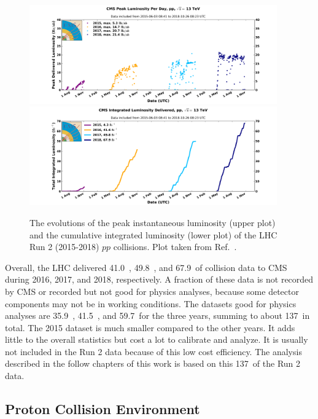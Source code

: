 \begin{figure}[!htb]
    \centering
    \includegraphics[width=0.95\textwidth]{pics/LHC_CMS/peak_lumi_pp_run2.png}
    \includegraphics[width=0.95\textwidth]{pics/LHC_CMS/int_lumi_cumulative_pp_1_run2.png}
    \caption{The evolutions of the peak instantaneous luminosity (upper plot) and the cumulative integrated luminosity (lower plot)
             of the LHC Run 2 (2015-2018) $pp$ collisions.
             Plot taken from Ref.~\cite{lhc_lumi_pub}.}
    \label{fig:lhc_lumi}
\end{figure}

Overall, the LHC delivered 41.0~\invfb, 49.8~\invfb, and 67.9~\invfb of collision data to CMS during 2016, 2017, and 2018, respectively.
A fraction of these data is not recorded by CMS or recorded but not good for physics analyses, because some detector components may not be in working conditions.
The datasets good for physics analyses are 35.9~\invfb, 41.5~\invfb, and 59.7~\invfb for the three years, summing to about 137~\invfb in total.
The 2015 dataset is much smaller compared to the other years.
It adds little to the overall statistics but cost a lot to calibrate and analyze.
It is usually not included in the Run 2 data because of this low cost efficiency.
The \hmm analysis described in the follow chapters of this work is based on this 137~\invfb of the Run 2 data.


\subsection{Proton Collision Environment}\label{sec:pp_env}

